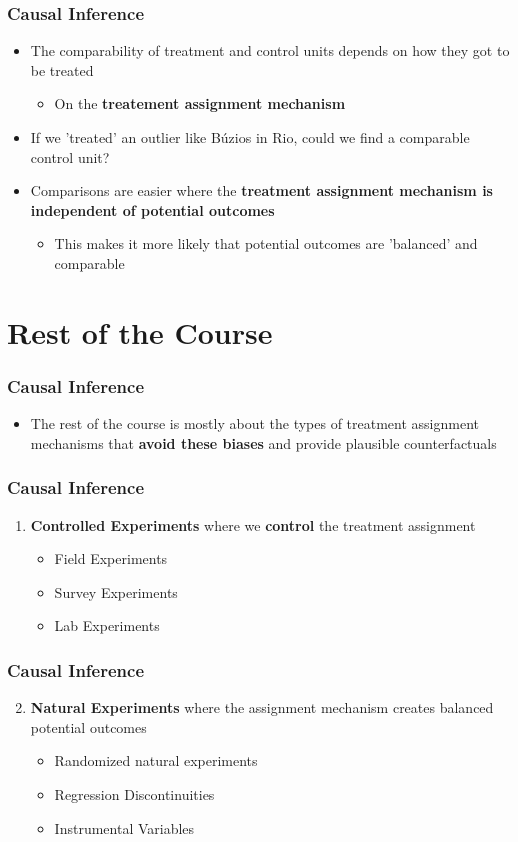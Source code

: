 \documentclass[xcolor=x11names,compress]{beamer}\usepackage[]{graphicx}\usepackage[]{color}
\renewcommand{\(}{\begin{columns}}
\renewcommand{\)}{\end{columns}}
\newcommand{\<}[1]{\begin{column}{#1}}
\renewcommand{\>}{\end{column}}
\begin{document}
\begin{frame}
\frametitle{Causal Inference}
\begin{itemize}
\item The comparability of treatment and control units depends on how they got to be treated
\begin{itemize}
\item On the \textbf{treatement assignment mechanism}
\end{itemize}
\item If we 'treated' an outlier like B\'{u}zios in Rio, could we find a comparable control unit?
\item Comparisons are easier where the \textbf{treatment assignment mechanism is independent of potential outcomes}
\begin{itemize}
\item This makes it more likely that potential outcomes are 'balanced' and comparable
\end{itemize}
\end{itemize}
\end{frame}

\section{Rest of the Course}

\begin{frame}
\frametitle{Causal Inference}
\begin{itemize}
\item The rest of the course is mostly about the types of treatment assignment mechanisms that \textbf{avoid these biases} and provide plausible counterfactuals
\end{itemize}
\end{frame}

\begin{frame}
\frametitle{Causal Inference}
\begin{enumerate}
\item \textbf{Controlled Experiments} where we \textbf{control} the treatment assignment
\begin{itemize}
\item Field Experiments
\item Survey Experiments
\item Lab Experiments
\end{itemize}
\end{enumerate}
\end{frame}

\begin{frame}
\frametitle{Causal Inference}
\begin{enumerate}
 \setcounter{enumi}{1}
\item \textbf{Natural Experiments} where the assignment mechanism creates balanced potential outcomes
\begin{itemize}
\item Randomized natural experiments
\item Regression Discontinuities
\item Instrumental Variables
\end{itemize}
\end{enumerate}
\end{frame}
\end{document}
